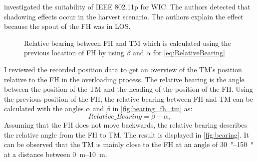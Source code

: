 \textcite{klingler_agriculture_2018} investigated the suitability of IEEE 802.11p for \ac{WIC}.
The authors detected that shadowing effects occur in the harvest scenario.
The authors explain the effect because the spout of the \ac{FH} was in \ac{LOS}.
\begin{figure}%
   \centering
   \caption{Relative bearing between \ac{FH} and \ac{TM} which is calculated using the previous location of \ac{FH} by using $\beta$ and $\alpha$ for \autoref{eq:RelativeBearing}}%
   \label{fig:bearing_fh_tm}%
\end{figure}
I reviewed the recorded position data to get an overview of the \ac{TM}'s position relative to the \ac{FH} in the overloading process. The relative bearing is the angle between the position of the \ac{TM} and the heading of the position of the \ac{FH}. Using the previous position of the \ac{FH}, the relative bearing between \ac{FH} and \ac{TM} can be calculated with the angles $\alpha$ and $\beta$ in \autoref{fig:bearing_fh_tm} as:
\begin{equation}\label{eq:RelativeBearing}
   Relative\_Bearing = \beta - \alpha ,
\end{equation}
Assuming that the \ac{FH} does not move backwards, the relative bearing describes the relative angle from the
\ac{FH} to \ac{TM}.
The result is displayed in \autoref{fig:bearing}.
It can be observed that the \ac{TM} is mainly close to the \ac{FH} at an angle of \SIrange{30}{150}{\degree} at
a distance between \SIrange{0}{10}{\metre}.

